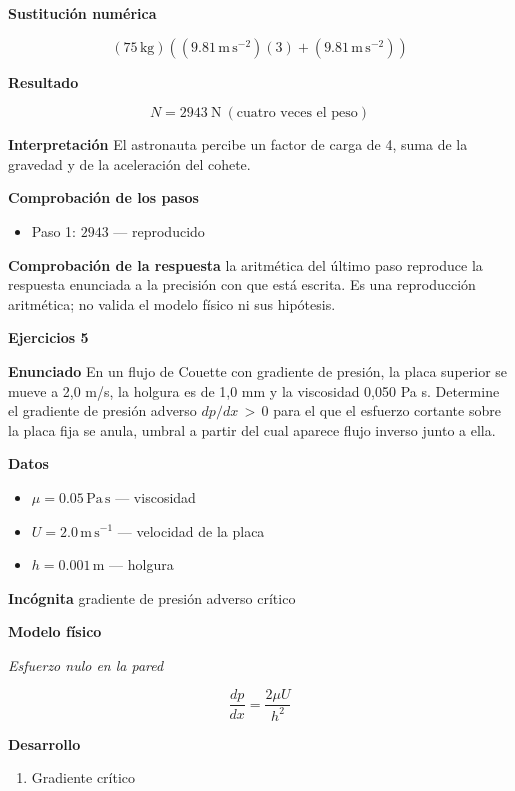 \documentclass[10pt,openany]{book}
\begin{document}
\noindent\textbf{Sustitución numérica}

\[
\left(75\,\mathrm{kg}\right) \left(\left(9.81\,\mathrm{m}\,\mathrm{s}^{-2}\right) \left(3\right) + \left(9.81\,\mathrm{m}\,\mathrm{s}^{-2}\right)\right)
\]

\noindent\textbf{Resultado}

\[
N = 2943\ \mathrm{N}\ (\text{cuatro veces el peso})
\]

\noindent\textbf{Interpretación}
El astronauta percibe un factor de carga de 4, suma de la gravedad y de la aceleración del cohete.

\noindent\textbf{Comprobación de los pasos}
\begin{itemize}
\item Paso 1: $2943$ — reproducido
\end{itemize}

\noindent\textbf{Comprobación de la respuesta} la aritmética del último paso reproduce la respuesta enunciada a la precisión con que está escrita. Es una reproducción aritmética; no valida el modelo físico ni sus hipótesis.

\noindent\textbf{Ejercicios 5}

\noindent\textbf{Enunciado}
En un flujo de Couette con gradiente de presión, la placa superior se mueve a 2,0 m/s, la holgura es de 1,0 mm y la viscosidad 0,050 Pa s. Determine el gradiente de presión adverso \(dp/dx\,>\,0\) para el que el esfuerzo cortante sobre la placa fija se anula, umbral a partir del cual aparece flujo inverso junto a ella.

\noindent\textbf{Datos}
\begin{itemize}
\item $\mu = 0.05\,\mathrm{Pa}\,\mathrm{s}$ — viscosidad
\item $U = 2.0\,\mathrm{m}\,\mathrm{s}^{-1}$ — velocidad de la placa
\item $h = 0.001\,\mathrm{m}$ — holgura
\end{itemize}

\noindent\textbf{Incógnita}
gradiente de presión adverso crítico

\noindent\textbf{Modelo físico}

\noindent\textit{Esfuerzo nulo en la pared}

\[
\frac{dp}{dx} = \frac{2\mu U}{h^{2}}
\]

\noindent\textbf{Desarrollo}
\begin{enumerate}
\item
Gradiente crítico
\end{enumerate}
\end{document}
